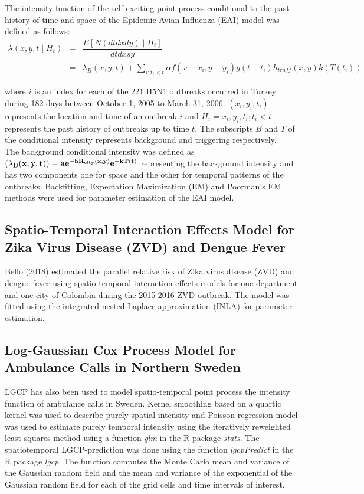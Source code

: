 \documentclass[a4paper]{thesis}
\begin{document}
The intensity function of the self-exciting point process conditional to the past history of time and space of the Epidemic Avian Influenza (EAI) model was defined as follows:
\begin{eqnarray*}
\lambda(x,y,t \mid H_t) &=& \dfrac{E\left[ N(dt dx dy) \mid H_t\right]}{dt dx sy}\\
&=& \lambda_B(x,y,t) + \sum_{i:t_i<t}\alpha f(x - x_i, y-y_i) g(t - t_i) h_{traff}(x,y)k(T(t_i))
\end{eqnarray*}

where $i$ is an index for each of the 221 H5N1 outbreaks occurred in Turkey during 182 days
between October 1, 2005 to March 31, 2006. $(x_i, y_i, t_i)$ represents the location and time of an outbreak $i$ and $H_i = {x_i, y_i, t_i ; t_i < t}$ represents the past history of outbreaks up to time $t$. The subscripts $B$ and $T$ of the conditional intensity represents background and triggering respectively.\\

The background conditional intensity was defined as $\bf(\lambda_B(x,y,t)) = ae^{-bR_{city}(x,y)} e^{-kT(t)}$ representing the background intensity and has two components one for space and the other for temporal patterns of the outbreaks. Backfitting, Expectation Maximization (EM) and Poorman's EM methods were used for parameter estimation of the EAI model.\cite{Kim}

\subsection{Spatio-Temporal Interaction Effects Model for Zika Virus Disease (ZVD) and Dengue Fever}

Bello (2018) estimated the parallel relative risk of Zika virus disease (ZVD) and
dengue fever using spatio-temporal interaction effects models for one department and one city of Colombia during the 2015-2016 ZVD outbreak. The model was fitted using the integrated nested Laplace approximation (INLA) for parameter estimation\cite{Bello2018}.

\subsection{Log-Gaussian Cox Process Model for Ambulance Calls in Northern Sweden}

LGCP has also been used to model spatio-temporal point process the intensity function of ambulance calls in Sweden\cite{Bayisa}. Kernel smoothing based on a quartic kernel was used to describe purely spatial intensity and Poisson regression model was used to estimate purely temporal intensity using the iteratively reweighted least squares method using a function \textit{glm} in the R package \textit{stats}. The spatiotemporal LGCP-prediction was done using the function \textit{lgcpPredict} in the R package \textit{lgcp}. The function computes the Monte Carlo mean
and variance of the Gaussian random field and the mean and variance of the exponential of the
Gaussian random field for each of the grid cells and time intervals of interest.
\end{document}
